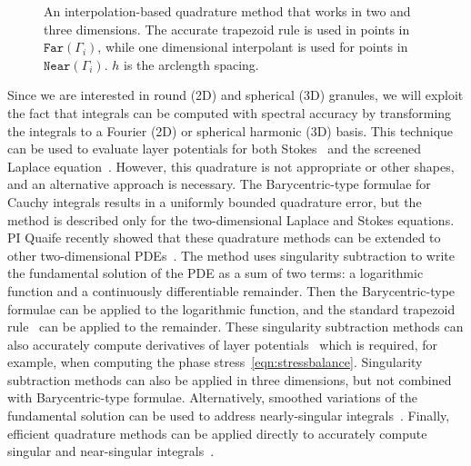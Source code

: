 \begin{figure}
  \vspace{-4pt}
  \centering
  
  \vspace{-15pt}
  \caption{\label{fig:interpquad} \footnotesize An interpolation-based
  quadrature method that works in two and three dimensions. The accurate
  trapezoid rule is used in points in $\mathtt{Far}(\Gamma_i)$, while
  one dimensional interpolant is used for points in
  $\mathtt{Near}(\Gamma_i)$. $h$ is the arclength spacing.}
\end{figure}
Since we are interested in round (2D) and spherical (3D) granules, we
will exploit the fact that integrals can be computed with spectral
accuracy by transforming the integrals to a Fourier (2D) or spherical
harmonic (3D) basis. This technique can be used to evaluate layer
potentials for both Stokes~\cite{cor-vee2018} and the screened Laplace
equation~\cite{koh-cor-che-vee2021}. However, this quadrature is not
appropriate or other shapes, and an alternative approach is necessary.
The Barycentric-type formulae for Cauchy integrals results in a
uniformly bounded quadrature error, but the method is described only for
the two-dimensional Laplace and Stokes equations. PI Quaife recently
showed that these quadrature methods can be extended to other
two-dimensional PDEs~\cite{che-lin-her-qua2022}. The method uses
singularity subtraction to write the fundamental solution of the PDE as
a sum of two terms: a logarithmic function and a continuously
differentiable remainder. Then the Barycentric-type formulae can be
applied to the logarithmic function, and the standard trapezoid
rule~\cite{tre-wei2014} can be applied to the remainder. These
singularity subtraction methods can also accurately compute derivatives
of layer potentials~\cite{car2021, car2020, car-kha-kim2018} which is
required, for example, when computing the phase
stress~\eqref{eqn:stressbalance}. Singularity subtraction methods can
also be applied in three dimensions, but not combined with
Barycentric-type formulae. Alternatively, smoothed variations of the
fundamental solution can be used to address nearly-singular
integrals~\cite{beale1, cor2001, tlu-bea2019}. Finally, efficient
quadrature methods can be applied directly to accurately compute
singular and near-singular integrals~\cite{khayat_2005,
gimbutas2013sisc}.

